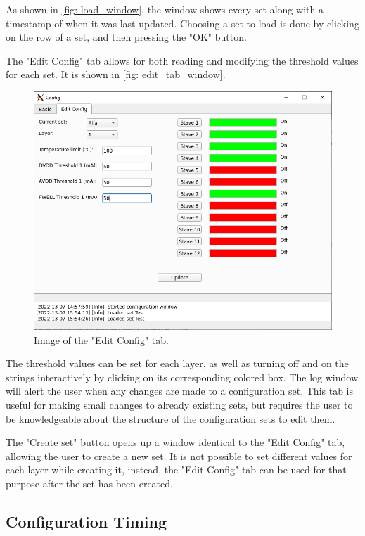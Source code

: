 \documentclass[main.tex]{subfiles}
\begin{document}
As shown in \autoref{fig: load_window}, the window shows every set along with a timestamp of when it was last updated. Choosing a set to load is done by clicking on the row of a set, and then pressing the "OK" button.

The "Edit Config" tab allows for both reading and modifying the threshold values for each set. It is shown in \autoref{fig: edit_tab_window}.

\begin{figure}[!ht]
    \centering
    \includegraphics[width=13cm, scale=1.5]{images/config_tab_gui.png}
    \caption{Image of the "Edit Config" tab.}
    \label{fig: edit_tab_window}
\end{figure}
\FloatBarrier

The threshold values can be set for each layer, as well as turning off and on the strings interactively by clicking on its corresponding colored box. The log window will alert the user when any changes are made to a configuration set. This tab is useful for making small changes to already existing sets, but requires the user to be knowledgeable about the structure of the configuration sets to edit them.

The "Create set" button opens up a window identical to the "Edit Config" tab, allowing the user to create a new set. It is not possible to set different values for each layer while creating it, instead, the "Edit Config" tab can be used for that purpose after the set has been created.


\subsection{Configuration Timing}
\label{ssec: con_timing}
\end{document}
